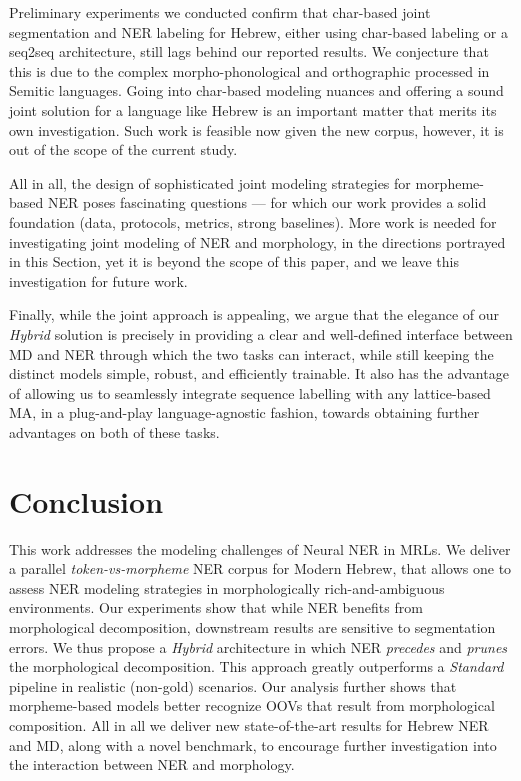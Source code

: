 \documentclass[11pt,a4paper]{article}
\newcommand{\FLIPMACRO}{{\em Hybrid}\xspace}
\newcommand{\YAPMACRO}{{\em Standard}\xspace}
\begin{document}
Preliminary experiments we conducted confirm that  char-based  joint segmentation and NER labeling for Hebrew, either using char-based labeling or a seq2seq architecture, still lags  behind our reported results. We conjecture that this is due to the complex morpho-phonological and orthographic processed in Semitic languages. Going into char-based modeling nuances and offering a sound joint solution for a language like Hebrew is an important matter that merits its own investigation. Such work is feasible now given the new corpus, however, it is out of the scope of the current study.


All in all, the design of  sophisticated joint modeling strategies for morpheme-based NER poses fascinating questions --- for which our work provides a solid  foundation  (data, protocols, metrics, strong baselines).
More work is needed for investigating joint modeling of  NER and morphology, in the directions portrayed in this Section, yet it is beyond the scope of this  paper, and we leave this investigation for future work. 

Finally, while the joint approach is appealing, we argue that the elegance of our  {\em Hybrid} solution is precisely in providing a clear and well-defined interface between MD and NER through which the two tasks can interact, while still keeping the distinct models simple, robust, and efficiently trainable. It also has the advantage of allowing us to seamlessly integrate sequence labelling with any  lattice-based MA,
in a plug-and-play language-agnostic  fashion, towards obtaining further advantages on both of these tasks.



\section{Conclusion}
\label{sec:conclusions}
This work addresses the modeling challenges of Neural NER in MRLs. 
We deliver a  parallel {\em token-vs-morpheme} NER corpus for Modern Hebrew, that allows one to assess   NER modeling strategies in morphologically rich-and-ambiguous environments. Our experiments show that while 
NER   benefits from morphological decomposition,
 downstream results are  sensitive to segmentation errors.
We thus  propose a   \FLIPMACRO architecture in which NER {\em precedes} and  {\em prunes} the morphological decomposition. This approach greatly outperforms a \YAPMACRO~ {pipeline} in realistic (non-gold)  scenarios.
Our analysis further shows  that morpheme-based models better recognize OOVs that result from morphological composition. 
All in all we deliver new state-of-the-art results for  Hebrew NER and MD,  along with a novel benchmark, to encourage further investigation  into the interaction between  NER and morphology.
\end{document}
